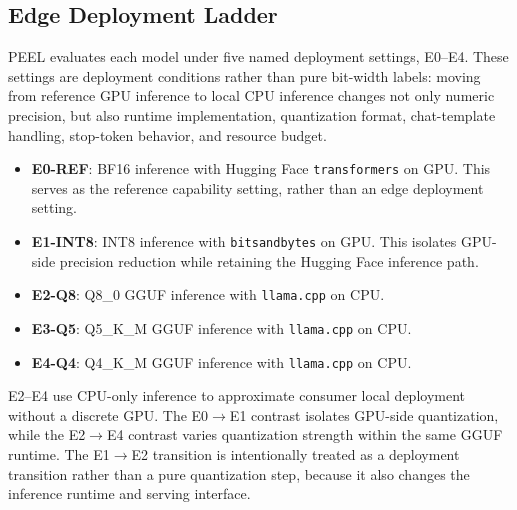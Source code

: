 \documentclass[letterpaper]{article} %
\begin{document}
\subsection{Edge Deployment Ladder}
\label{sec:edge}

PEEL evaluates each model under five named deployment settings, E0--E4.
These settings are deployment conditions rather than pure bit-width labels:
moving from reference GPU inference to local CPU inference changes not only
numeric precision, but also runtime implementation, quantization format,
chat-template handling, stop-token behavior, and resource budget.

\begin{itemize}
  \item \textbf{E0-REF}: BF16 inference with Hugging Face
  \texttt{transformers} on GPU. This serves as the reference capability setting,
  rather than an edge deployment setting.
  \item \textbf{E1-INT8}: INT8 inference with \texttt{bitsandbytes} on GPU.
  This isolates GPU-side precision reduction while retaining the Hugging Face
  inference path.
  \item \textbf{E2-Q8}: Q8\_0 GGUF inference with \texttt{llama.cpp} on CPU.
  \item \textbf{E3-Q5}: Q5\_K\_M GGUF inference with \texttt{llama.cpp} on CPU.
  \item \textbf{E4-Q4}: Q4\_K\_M GGUF inference with \texttt{llama.cpp} on CPU.
\end{itemize}

E2--E4 use CPU-only inference to approximate consumer local deployment without
a discrete GPU. The E0$\rightarrow$E1 contrast isolates GPU-side quantization,
while the E2$\rightarrow$E4 contrast varies quantization strength within the
same GGUF runtime. The E1$\rightarrow$E2 transition is intentionally treated as
a deployment transition rather than a pure quantization step, because it also
changes the inference runtime and serving interface.

\end{document}
